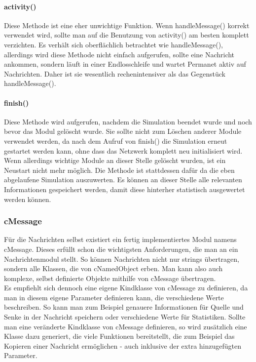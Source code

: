 \paragraph{activity()}

Diese Methode ist eine eher unwichtige Funktion. Wenn handleMessage() korrekt verwendet wird, sollte man auf die Benutzung von activity() am besten komplett verzichten. Es verhält sich oberflächlich betrachtet wie handleMessage(), allerdings wird diese Methode nicht einfach aufgerufen, sollte eine Nachricht ankommen, sondern läuft in einer Endlosschleife und wartet Permanet aktiv auf Nachrichten. Daher ist sie wesentlich rechenintensiver als das Gegenstück handleMessage().

\paragraph{finish()}

Diese Methode wird aufgerufen, nachdem die Simulation beendet wurde und noch bevor das Modul gelöscht wurde. Sie sollte nicht zum Löschen anderer Module verwendet werden, da nach dem Aufruf von finish() die Simulation erneut gestartet werden kann, ohne dass das Netzwerk komplett neu initialisiert wird. Wenn allerdings wichtige Module an dieser Stelle gelöscht wurden, ist ein Neustart nicht mehr möglich.\newline
Die Methode ist stattdessen dafür da die eben abgelaufene Simulation auszuwerten. Es können an dieser Stelle alle relevanten Informationen gespeichert werden, damit diese hinterher statistisch ausgewertet werden können.

\subsubsection{cMessage}

Für die Nachrichten selbst existiert ein fertig implementiertes Modul namens cMessage. Dieses erfüllt schon die wichtigsten Anforderungen, die man an ein Nachrichtenmodul stellt. So können Nachrichten nicht nur strings übertragen, sondern alle Klassen, die von cNamedObject erben. Man kann also auch komplexe, selbst definierte Objekte mithilfe von cMessage übertragen.\\
Es empfiehlt sich dennoch eine eigene Kindklasse von cMessage zu definieren, da man in diesem eigene Parameter definieren kann, die verschiedene Werte beschreiben. So kann man zum Beispiel genauere Informationen für Quelle und Senke in der Nachricht speichern oder verschiedene Werte für Statistiken. Sollte man eine veränderte Kindklasse von cMessage definieren, so wird zusätzlich eine Klasse dazu generiert, die viele Funktionen bereitstellt, die zum Beispiel das Kopieren einer Nachricht ermöglichen - auch inklusive der extra hinzugefügten Parameter.

